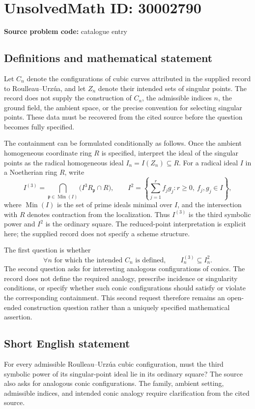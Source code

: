 \documentclass[11pt]{article}
\begin{document}
\section*{UnsolvedMath ID: 30002790}
\textbf{Source problem code:} catalogue entry
\subsection{Definitions and mathematical statement}
Let \(C_n\) denote the configurations of cubic curves attributed in the supplied record to Roulleau--Urz\'{u}a, and let \(Z_n\) denote their intended sets of singular points. The record does not supply the construction of \(C_n\), the admissible indices \(n\), the ground field, the ambient space, or the precise convention for selecting singular points. These data must be recovered from the cited source before the question becomes fully specified.

The containment can be formulated conditionally as follows. Once the ambient homogeneous coordinate ring \(R\) is specified, interpret the ideal of the singular points as the radical homogeneous ideal \(I_n=I(Z_n)\subseteq R\). For a radical ideal \(I\) in a Noetherian ring \(R\), write
\[
 I^{(3)}=\bigcap_{\mathfrak p\in\operatorname{Min}(I)}\bigl(I^3R_{\mathfrak p}\cap R\bigr),
 \qquad
 I^2=\left\{\sum_{j=1}^{r}f_jg_j:r\geq 0,\ f_j,g_j\in I\right\},
\]
where \(\operatorname{Min}(I)\) is the set of prime ideals minimal over \(I\), and the intersection with \(R\) denotes contraction from the localization. Thus \(I^{(3)}\) is the third symbolic power and \(I^2\) is the ordinary square. The reduced-point interpretation is explicit here; the supplied record does not specify a scheme structure.

The first question is whether
\[
 \forall n\text{ for which the intended }C_n\text{ is defined},
 \qquad I_n^{(3)}\subseteq I_n^2.
\]
The second question asks for interesting analogous configurations of conics. The record does not define the required analogy, prescribe incidence or singularity conditions, or specify whether such conic configurations should satisfy or violate the corresponding containment. This second request therefore remains an open-ended construction question rather than a uniquely specified mathematical assertion.
\subsection{Short English statement}
For every admissible Roulleau--Urz\'{u}a cubic configuration, must the third symbolic power of its singular-point ideal lie in its ordinary square? The source also asks for analogous conic configurations. The family, ambient setting, admissible indices, and intended conic analogy require clarification from the cited source.
\end{document}
